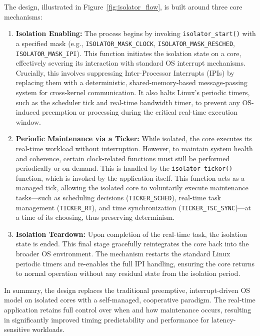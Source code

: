 \documentclass[letterpaper]{article}
\begin{document}
The design, illustrated in Figure~\ref{fig:isolator_flow}, is built around three core mechanisms:

\begin{enumerate}
    \item \textbf{Isolation Enabling:} The process begins by invoking \texttt{isolator\_start()} with a specified mask (e.g., \texttt{ISOLATOR\_MASK\_CLOCK}, \texttt{ISOLATOR\_MASK\_RESCHED}, \texttt{ISOLATOR\_MASK\_IPI}). This function initiates the isolation state on a core, effectively severing its interaction with standard OS interrupt mechanisms. Crucially, this involves suppressing Inter-Processor Interrupts (IPIs) by replacing them with a deterministic, shared-memory-based message-passing system for cross-kernel communication. It also halts Linux's periodic timers, such as the scheduler tick and real-time bandwidth timer, to prevent any OS-induced preemption or processing during the critical real-time execution window.

    \item \textbf{Periodic Maintenance via a Ticker:} While isolated, the core executes its real-time workload without interruption. However, to maintain system health and coherence, certain clock-related functions must still be performed periodically or on-demand. This is handled by the \texttt{isolator\_tickor()} function, which is invoked by the application itself. This function acts as a managed tick, allowing the isolated core to voluntarily execute maintenance tasks---such as scheduling decisions (\texttt{TICKER\_SCHED}), real-time task management (\texttt{TICKER\_RT}), and time synchronization (\texttt{TICKER\_TSC\_SYNC})---at a time of its choosing, thus preserving determinism.

    \item \textbf{Isolation Teardown:} Upon completion of the real-time task, the isolation state is ended. This final stage gracefully reintegrates the core back into the broader OS environment. The mechanism restarts the standard Linux periodic timers and re-enables the full IPI handling, ensuring the core returns to normal operation without any residual state from the isolation period.
\end{enumerate}

In summary, the design replaces the traditional preemptive, interrupt-driven OS model on isolated cores with a self-managed, cooperative paradigm. The real-time application retains full control over when and how maintenance occurs, resulting in significantly improved timing predictability and performance for latency-sensitive workloads.
\end{document}
